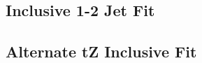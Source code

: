 \subsection{Inclusive 1-2 Jet Fit}
\label{sec:incFit}


\subsection{Alternate tZ Inclusive Fit}
\label{sec:inc_tZ}





